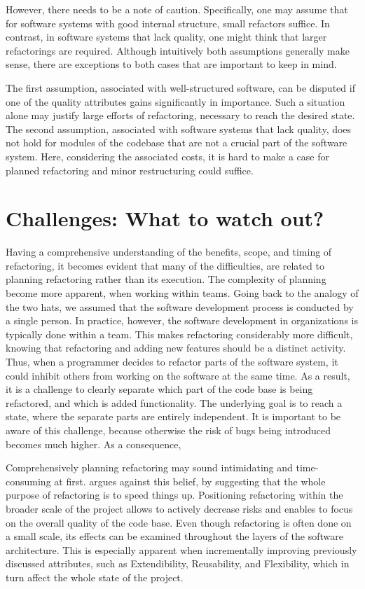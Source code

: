 However, there needs to be a note of caution. Specifically, one may assume that for software systems with good internal structure, small refactors suffice. In contrast, in software systems that lack quality, one might think that larger refactorings are required. Although intuitively both assumptions generally make sense, there are exceptions to both cases that are important to keep in mind. 

The first assumption, associated with well-structured software, can be disputed if one of the quality attributes gains significantly in importance. Such a situation alone may justify large efforts of refactoring, necessary to reach the desired state. 
The second assumption, associated with software systems that lack quality, does not hold for modules of the codebase that are not a crucial part of the software system. Here, considering the associated costs, it is hard to make a case for planned refactoring and minor restructuring could suffice.

\section{Challenges: What to watch out?}
\label{sec:challenges}
Having a comprehensive understanding of the benefits, scope, and timing of refactoring, 
	it becomes evident that many of the difficulties, are related to planning refactoring rather than its execution.
The complexity of planning become more apparent,
	when working within teams.
Going back to the analogy of the two hats, 
	we assumed that the software development process 
	is conducted by a single person. 
In practice, however, 
	the software development in organizations is typically done within a team. 
 This makes refactoring considerably more difficult,
 	knowing that refactoring and adding new features 
	should be a distinct activity. 
Thus, when a programmer decides to refactor parts of the software system,
	it could inhibit others from working on the software at the same time. 
As a result, 
	it is a challenge to clearly separate 
	which part of the code base is being refactored, 
	and which is added functionality. 
The underlying goal is to reach a state,
	where the separate parts are entirely independent. 
It is important to be aware of this challenge, 
	because otherwise the risk of bugs being introduced becomes much higher. 
As a consequence, 

Comprehensively planning refactoring 
	may sound intimidating and time-consuming at first.
\textcite{fowler2018} argues against this belief,
	by suggesting that the whole purpose of refactoring 
	is to speed things up.
Positioning refactoring within the broader scale of the project 
	allows to actively decrease risks and 
    enables to focus on the overall quality of the code base.
Even though refactoring is often done on a small scale,
	its effects can be examined 
	throughout the layers of the software architecture.
This is especially apparent when incrementally improving previously discussed attributes,
	such as Extendibility, Reusability, and Flexibility, 
	which in turn affect the whole state of the project. 

